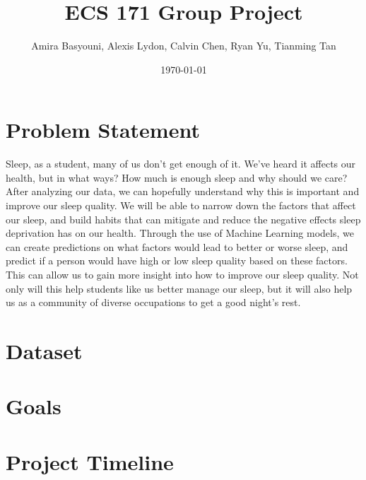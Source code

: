 \documentclass[11pt, letterpaper]{article}
\title{ECS 171 Group Project}
\author{Amira Basyouni, Alexis Lydon, Calvin Chen, Ryan Yu, Tianming Tan}
\date{\today}
\begin{document}
    \maketitle
    \newpage

    \section*{Problem Statement}
    Sleep, as a student, many of us don't get enough of it. We've heard it 
    affects our health, but in what ways? How much is enough sleep and why 
    should we care? After analyzing our data, we can hopefully understand 
    why this is important and improve our sleep quality. We will be able to 
    narrow down the factors that affect our sleep, and build habits that can 
    mitigate and reduce the negative effects sleep deprivation has on our 
    health. Through the use of Machine Learning models, we can create 
    predictions on what factors would lead to better or worse sleep, 
    and predict if a person would have high or low sleep quality based 
    on these factors. This can allow us to gain more insight into how to 
    improve our sleep quality. Not only will this help students like us 
    better manage our sleep, but it will also help us as a community of 
    diverse occupations to get a good night's rest.

    \section{Dataset}

    \section{Goals}

    \section{Project Timeline}
\end{document}
